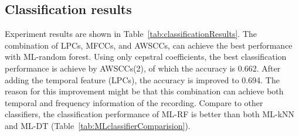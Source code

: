 \subsection{Classification results}

Experiment results are shown in Table~\ref{tab:classificationResults}. The combination of LPCs, MFCCs, and AWSCCs, can achieve the best performance with ML-random forest. Using only cepstral coefficients, the best classification performance is achieve by AWSCCs(2), of which the accuracy is 0.662. After adding the temporal feature (LPCs), the accuracy is improved to 0.694. The reason for this improvement might be that this combination can achieve both temporal and frequency information of the recording. Compare to other classifiers, the classification performance of ML-RF is better than both ML-kNN and ML-DT (Table~\ref{tab:MLclassifierComparision}).



\begin{table}[htb!]
\centering
\caption{Comparison of different feature sets for ML classification}
\label{tab:classificationResults}
\end{table}




